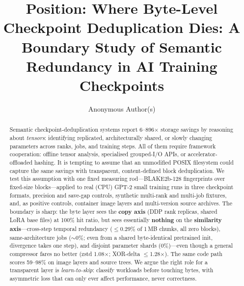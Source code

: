 \documentclass[sigconf,10pt,anonymous,review]{acmart}
\begin{document}
\title{Position: Where Byte-Level Checkpoint Deduplication Dies:
A Boundary Study of Semantic Redundancy in AI Training Checkpoints}

\author{Anonymous Author(s)}
\renewcommand{\shortauthors}{Anonymous}

\begin{abstract}
Semantic checkpoint-deduplication systems report 6--896$\times$ storage
savings by reasoning about \emph{tensors}: identifying replicated,
architecturally shared, or slowly changing parameters across ranks, jobs,
and training steps. All of them require framework cooperation: offline
tensor analysis, specialised grouped-I/O APIs, or accelerator-offloaded
hashing. It is tempting to assume that an unmodified POSIX filesystem
could capture the same savings with transparent, content-defined block
deduplication. We test this assumption with one fixed measuring
rod---BLAKE2b-128 fingerprints over fixed-size blocks---applied to real
(CPU) GPT-2 small training runs in three checkpoint formats, precision
and save-gap controls, synthetic multi-rank and multi-job fixtures, and,
as positive controls, container image layers and multi-version source
archives. The boundary is sharp: the byte layer sees the \textbf{copy
axis} (DDP rank replicas, shared LoRA base files) at 100\% hit ratio, but
sees essentially \textbf{nothing} on the \textbf{similarity
axis}---cross-step temporal redundancy ($\le$0.29\% of 1\,MB chunks, all
zero blocks), same-architecture jobs ($\sim$0\%; even from a shared
byte-identical pretrained init, divergence takes one step), and
disjoint parameter shards (0\%)---even though a general compressor fares
no better (zstd 1.08$\times$; XOR-delta $\le$1.28$\times$). The same code
path scores 59--98\% on image layers and source trees. We argue the right
role for a transparent layer is \emph{learn-to-skip}: classify workloads
before touching bytes, with asymmetric loss that can only ever affect
performance, never correctness.
\end{abstract}

\end{document}
